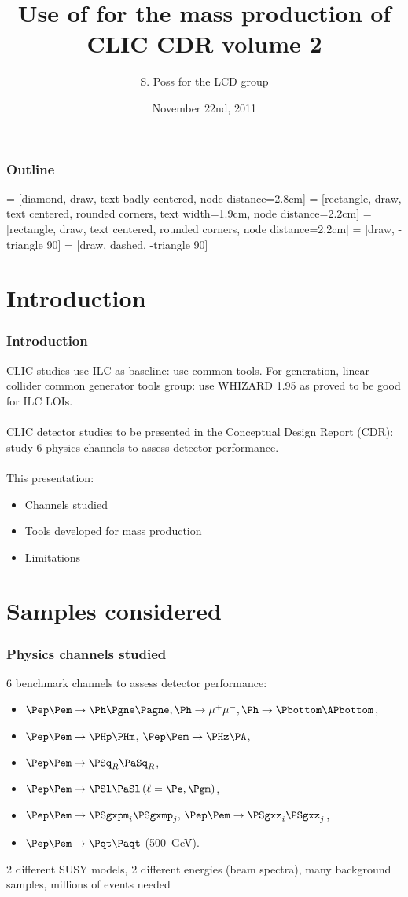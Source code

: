 \documentclass{beamer}
\author{S. Poss for the LCD group}
\title{Use of \whizard for the mass production of CLIC CDR volume 2}
\institute[CERN]
{
  CERN
}
\date{November 22nd, 2011}
\newcommand{\whizard}{WHIZARD\xspace}
\begin{document}
\begin{frame}
\titlepage
\end{frame}
\begin{frame}
\frametitle{Outline}
\tableofcontents
\end{frame}
 = [diamond, draw, text badly centered, node distance=2.8cm]
 = [rectangle, draw, text centered, rounded corners, text width=1.9cm, node distance=2.2cm]
 = [rectangle, draw, text centered, rounded corners, node distance=2.2cm]
 = [draw, -triangle 90]
 = [draw, dashed, -triangle 90]
\section{Introduction}

\begin{frame}
\frametitle{Introduction}
CLIC studies use ILC as baseline: \alert{use common tools}. For generation,
linear collider common generator tools group: use \whizard1.95 as proved to be
good for ILC LOIs.\\
~\\
CLIC detector studies to be presented in the Conceptual Design Report (CDR):
study 6 physics channels to assess detector performance.\\
~\\
This presentation:
\begin{itemize}
  \item Channels studied
  \item Tools developed for mass production
  \item Limitations
\end{itemize}
\end{frame}

\section{Samples considered}
\begin{frame}
\frametitle{Physics channels studied}
6 benchmark channels to assess detector performance:
\begin{itemize}
\item $\Pep\Pem \to \Ph \Pgne \Pagne, \Ph \to \mu^+\mu^-, \Ph \to
\Pbottom\APbottom$,
\item  $\Pep\Pem \to \PHp \PHm$, $\Pep\Pem \to \PHz \PA$, 
\item $\Pep\Pem \to \PSq_R \PaSq_R$, 
\item $\Pep\Pem \to \PSl \PaSl \,(\ell = \Pe,\Pgm)$, 
\item $\Pep\Pem \to \PSgxpm_i \PSgxmp_j,\, \Pep\Pem \to \PSgxz_i \PSgxz_j$,
\item  $\Pep\Pem \to \Pqt \Paqt$ (500~GeV).
\end{itemize}
2 different SUSY models, 2 different energies (beam spectra), many background
samples, millions of events needed
\end{frame}
\end{document}
